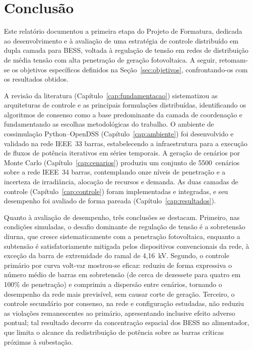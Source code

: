 \chapter{Conclusão}
\label{cap:conclusao}

Este relatório documentou a primeira etapa do Projeto de Formatura, dedicada ao desenvolvimento 
e à avaliação de uma estratégia de controle distribuído em dupla camada para BESS, voltada à 
regulação de tensão em redes de distribuição de média tensão com alta penetração de geração 
fotovoltaica. A seguir, retomam-se os objetivos específicos definidos na 
Seção~\ref{sec:objetivos}, confrontando-os com os resultados obtidos.

A revisão da literatura (Capítulo~\ref{cap:fundamentacao}) sistematizou as arquiteturas de 
controle e as principais formulações distribuídas, identificando os algoritmos de consenso 
como a base predominante da camada de coordenação e fundamentando as escolhas metodológicas 
do trabalho. O ambiente de cossimulação Python--OpenDSS (Capítulo~\ref{cap:ambiente}) foi 
desenvolvido e validado na rede IEEE~33 barras, estabelecendo a infraestrutura para a execução 
de fluxos de potência iterativos em séries temporais. A geração de cenários por Monte Carlo 
(Capítulo~\ref{cap:cenarios}) produziu um conjunto de 5500~cenários sobre a rede IEEE~34 
barras, contemplando onze níveis de penetração e a incerteza de irradiância, alocação de 
recursos e demanda. As duas camadas de controle (Capítulo~\ref{cap:controle}) foram 
implementadas e integradas, e seu desempenho foi avaliado de forma pareada 
(Capítulo~\ref{cap:resultados}).

Quanto à avaliação de desempenho, três conclusões se destacam. Primeiro, nas condições 
simuladas, o desafio dominante de regulação de tensão é a sobretensão diurna, que cresce 
sistematicamente com a penetração fotovoltaica, enquanto a subtensão é satisfatoriamente 
mitigada pelos dispositivos convencionais da rede, à exceção da barra de extremidade do 
ramal de 4,16~kV. Segundo, o controle primário por curva volt-var mostrou-se eficaz: 
reduziu de forma expressiva o número médio de barras em sobretensão (de cerca de dezessete 
para quatro em 100\% de penetração) e comprimiu a dispersão entre cenários, tornando o 
desempenho da rede mais previsível, sem causar corte de geração. Terceiro, o controle 
secundário por consenso, na rede e configuração estudadas, não reduziu as violações 
remanescentes ao primário, apresentando inclusive efeito adverso pontual; tal resultado 
decorre da concentração espacial dos BESS no alimentador, que limita o alcance da 
redistribuição de potência sobre as barras críticas próximas à subestação.

